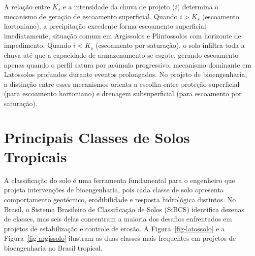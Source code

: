 \documentclass[
  portuguese,
  11pt,
  a4paper,
  open=any]{scrbook}
\begin{document}
A relação entre \(K_s\) e a intensidade da chuva de projeto (\(i\))
determina o mecanismo de geração de escoamento superficial. Quando
\(i > K_s\) (escoamento hortoniano), a precipitação excedente forma
escoamento superficial imediatamente, situação comum em Argissolos e
Plintossolos com horizonte de impedimento. Quando \(i < K_s\)
(escoamento por saturação), o solo infiltra toda a chuva até que a
capacidade de armazenamento se esgote, gerando escoamento apenas quando
o perfil satura por acúmulo progressivo, mecanismo dominante em
Latossolos profundos durante eventos prolongados. No projeto de
bioengenharia, a distinção entre esses mecanismos orienta a escolha
entre proteção superficial (para escoamento hortoniano) e drenagem
subsuperficial (para escoamento por saturação).

\section{Principais Classes de Solos
Tropicais}\label{principais-classes-de-solos-tropicais}

A classificação do solo é uma ferramenta fundamental para o engenheiro
que projeta intervenções de bioengenharia, pois cada classe de solo
apresenta comportamento geotécnico, erodibilidade e resposta hidrológica
distintos. No Brasil, o Sistema Brasileiro de Classificação de Solos
(SiBCS) identifica dezenas de classes, mas seis delas concentram a
maioria dos desafios enfrentados em projetos de estabilização e controle
de erosão. A Figura~\ref{fig-latossolo} e a Figura~\ref{fig-argissolo}
ilustram as duas classes mais frequentes em projetos de bioengenharia no
Brasil tropical.
\end{document}
